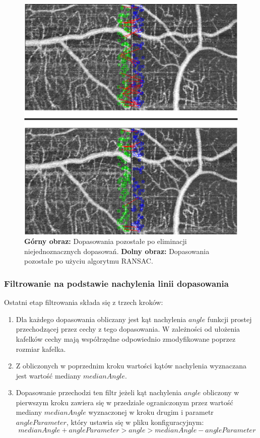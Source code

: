 \begin{figure}[htb]
  \centering
  \includegraphics[width=\textwidth]{gfx/ransac_filter}
  \caption{\textbf{Górny obraz:} Dopasowania pozostałe po eliminacji niejednoznacznych dopasowań. \textbf{Dolny obraz:} Dopasowania pozostałe po użyciu algorytmu RANSAC.}
  \label{fig:proponowane_algorytmy:ransac_filter}
\end{figure}

\subsubsection{Filtrowanie na podstawie nachylenia linii dopasowania}
\label{sec:proponowane_algorytmy:slope_filtering}

Ostatni etap filtrowania składa się z trzech kroków:

\begin{enumerate}
\item Dla każdego dopasowania obliczany jest kąt nachylenia $angle$ funkcji prostej przechodzącej przez cechy z tego dopasowania. W zależności od ułożenia kafelków cechy mają współrzędne odpowiednio zmodyfikowane poprzez rozmiar kafelka.
\item Z obliczonych w poprzednim kroku wartości kątów nachylenia wyznaczana jest wartość mediany $medianAngle$.
\item Dopasowanie przechodzi ten filtr jeżeli kąt nachylenia $angle$ obliczony w pierwszym kroku zawiera się w przedziale ograniczonym przez wartość mediany $medianAngle$ wyznaczonej w kroku drugim i parametr $angleParameter$, który ustawia się w pliku konfiguracyjnym:
\begin{equation}
medianAngle + angleParameter > angle > medianAngle - angleParameter
\label{eq:angle}
\end{equation}
\end{enumerate}

